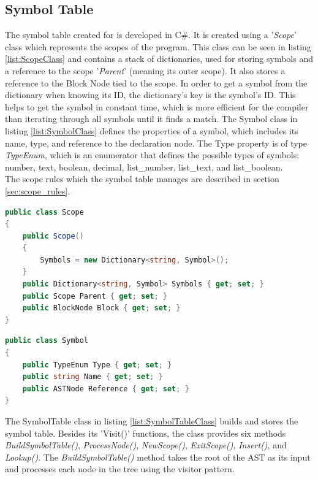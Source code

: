 \subsection{Symbol Table}
The symbol table created for \lang is developed in C\#. It is created using a '\textit{Scope}' class which represents the scopes of the program. This class can be seen in listing \ref{list:ScopeClass} and contains a stack of dictionaries, used for storing symbols and a reference to the scope '\textit{Parent}' (meaning its outer scope). It also stores a reference to the Block Node tied to the scope. In order to get a symbol from the dictionary when knowing its ID, the dictionary's key is the symbol's ID. This helps to get the symbol in constant time, which is more efficient for the compiler than iterating through all symbols until it finds a match. The Symbol class in listing \ref{list:SymbolClass} defines the properties of a symbol, which includes its name, type, and reference to the declaration node. The Type property is of type \textit{TypeEnum}, which is an enumerator that defines the possible types of symbols: number, text, boolean, decimal,  list\_number, list\_text, and list\_boolean.\\
The scope rules which the symbol table manages are described in section \ref{sec:scope_rules}.

\begin{lstlisting}[language = csharp, firstnumber=28, label={list:ScopeClass},caption=Scope Class - CobraCompiler/SymbolTable.cs]
public class Scope
{
    public Scope()
    {
        Symbols = new Dictionary<string, Symbol>();
    }
    public Dictionary<string, Symbol> Symbols { get; set; }
    public Scope Parent { get; set; }
    public BlockNode Block { get; set; }
}
\end{lstlisting}

\begin{lstlisting}[language = csharp, firstnumber=21, label={list:SymbolClass},caption=Symbol Class - CobraCompiler/SymbolTable.cs]
public class Symbol
{
    public TypeEnum Type { get; set; }
    public string Name { get; set; }
    public ASTNode Reference { get; set; }
}
\end{lstlisting}

\noindent
The SymbolTable class in listing \ref{list:SymbolTableClass} builds and stores the symbol table. Besides its 'Visit()' functions, the class provides six methods \textit{BuildSymbolTable()}, \textit{ProcessNode()}, \textit{NewScope()}, \textit{ExitScope()}, \textit{Insert()}, and \textit{Lookup()}. The \textit{BuildSymbolTable()} method takes the root of the AST as its input and processes each node in the tree using the visitor pattern. \\

